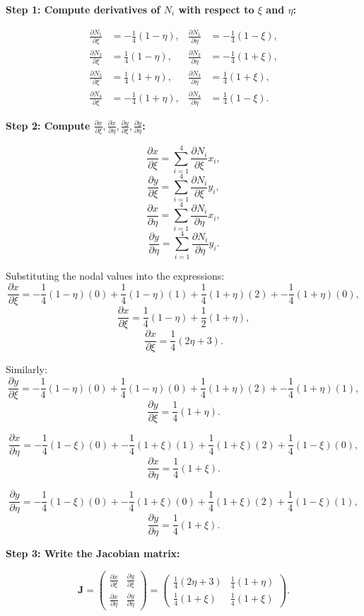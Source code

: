 \documentclass[11pt]{article}
\begin{document}
\textbf{Step 1: Compute derivatives of \(N_i\) with respect to \(\xi\) and \(\eta\):}

\[
\begin{aligned}
\frac{\partial N_1}{\partial \xi} &= -\frac{1}{4}(1-\eta), & \frac{\partial N_1}{\partial \eta} &= -\frac{1}{4}(1-\xi), \\
\frac{\partial N_2}{\partial \xi} &= \frac{1}{4}(1-\eta), & \frac{\partial N_2}{\partial \eta} &= -\frac{1}{4}(1+\xi), \\
\frac{\partial N_3}{\partial \xi} &= \frac{1}{4}(1+\eta), & \frac{\partial N_3}{\partial \eta} &= \frac{1}{4}(1+\xi), \\
\frac{\partial N_4}{\partial \xi} &= -\frac{1}{4}(1+\eta), & \frac{\partial N_4}{\partial \eta} &= \frac{1}{4}(1-\xi).
\end{aligned}
\]

\textbf{Step 2: Compute \(\frac{\partial x}{\partial \xi}, \frac{\partial x}{\partial \eta}, \frac{\partial y}{\partial \xi}, \frac{\partial y}{\partial \eta}\):}

\[
\frac{\partial x}{\partial \xi} = \sum_{i=1}^4 \frac{\partial N_i}{\partial \xi} x_i,
\]
\[
\frac{\partial y}{\partial \xi} = \sum_{i=1}^4 \frac{\partial N_i}{\partial \xi} y_i,
\]
\[
\frac{\partial x}{\partial \eta} = \sum_{i=1}^4 \frac{\partial N_i}{\partial \eta} x_i,
\]
\[
\frac{\partial y}{\partial \eta} = \sum_{i=1}^4 \frac{\partial N_i}{\partial \eta} y_i.
\]

Substituting the nodal values into the expressions:
\[
\frac{\partial x}{\partial \xi} = -\frac{1}{4}(1-\eta)(0) + \frac{1}{4}(1-\eta)(1) + \frac{1}{4}(1+\eta)(2) + -\frac{1}{4}(1+\eta)(0),
\]
\[
\frac{\partial x}{\partial \xi} = \frac{1}{4}(1-\eta) + \frac{1}{2}(1+\eta),
\]
\[
\frac{\partial x}{\partial \xi} = \frac{1}{4}(2\eta + 3).
\]

Similarly:
\[
\frac{\partial y}{\partial \xi} = -\frac{1}{4}(1-\eta)(0) + \frac{1}{4}(1-\eta)(0) + \frac{1}{4}(1+\eta)(2) + -\frac{1}{4}(1+\eta)(1),
\]
\[
\frac{\partial y}{\partial \xi} = \frac{1}{4}(1+\eta).
\]

\[
\frac{\partial x}{\partial \eta} = -\frac{1}{4}(1-\xi)(0) + -\frac{1}{4}(1+\xi)(1) + \frac{1}{4}(1+\xi)(2) + \frac{1}{4}(1-\xi)(0),
\]
\[
\frac{\partial x}{\partial \eta} = \frac{1}{4}(1+\xi).
\]

\[
\frac{\partial y}{\partial \eta} = -\frac{1}{4}(1-\xi)(0) + -\frac{1}{4}(1+\xi)(0) + \frac{1}{4}(1+\xi)(2) + \frac{1}{4}(1-\xi)(1),
\]
\[
\frac{\partial y}{\partial \eta} = \frac{1}{4}(1+\xi).
\]

\textbf{Step 3: Write the Jacobian matrix:}

\[
\mathbf{J} =
\begin{pmatrix}
\frac{\partial x}{\partial \xi} & \frac{\partial y}{\partial \xi} \\
\frac{\partial x}{\partial \eta} & \frac{\partial y}{\partial \eta}
\end{pmatrix} =
\begin{pmatrix}
\frac{1}{4}(2\eta + 3) & \frac{1}{4}(1+\eta) \\
\frac{1}{4}(1+\xi) & \frac{1}{4}(1+\xi)
\end{pmatrix}.
\]
\end{document}
